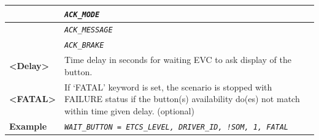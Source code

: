 \begin{itemize}
\begin{longtable}{|l|l|}
				\hline

				&	\begin{minipage}[t]{0.78\linewidth} \emph{\texttt{ACK\_MODE}} \end{minipage} \\

				\hline

				&	\begin{minipage}[t]{0.78\linewidth} \emph{\texttt{ACK\_MESSAGE}} \end{minipage} \\

				\hline

				&	\begin{minipage}[t]{0.78\linewidth} \emph{\texttt{ACK\_BRAKE}} \end{minipage} \\

				\hline


					\begin{minipage}[t]{0.22\linewidth} \textbf{<Delay>} \end{minipage}
				&	\begin{minipage}[t]{0.78\linewidth} Time delay in seconds for waiting EVC to ask display of the button. \end{minipage} \\

				\hline

					\begin{minipage}[t]{0.22\linewidth} \textbf{<FATAL>} \end{minipage}
				&	\begin{minipage}[t]{0.78\linewidth} If ‘FATAL’ keyword is set, the scenario is stopped with FAILURE status if the button(s) availability do(es) not match within time given delay. (optional) \end{minipage} \\

				\hline

					\begin{minipage}[t]{0.22\linewidth} \textbf{Example} \end{minipage}
				&	\begin{minipage}[t]{0.78\linewidth} \emph{\texttt{WAIT\_BUTTON = ETCS\_LEVEL, DRIVER\_ID, !SOM, 1, FATAL}} \end{minipage} \\

				\hline \hline

			\end{longtable}


\end{itemize}
